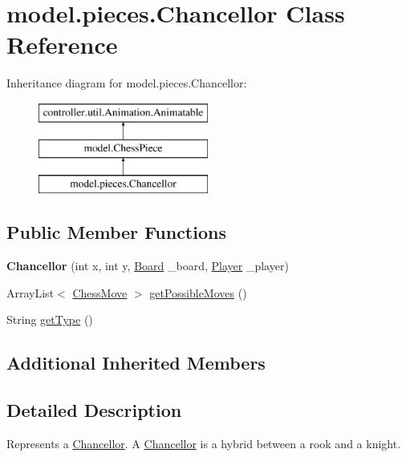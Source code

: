 \hypertarget{classmodel_1_1pieces_1_1_chancellor}{\section{model.\-pieces.\-Chancellor Class Reference}
\label{classmodel_1_1pieces_1_1_chancellor}
}
Inheritance diagram for model.\-pieces.\-Chancellor\-:\begin{figure}[H]
\begin{center}
\leavevmode
\includegraphics[height=3.000000cm]{classmodel_1_1pieces_1_1_chancellor}
\end{center}
\end{figure}
\subsection*{Public Member Functions}
\begin{DoxyCompactItemize}
\item 
\hypertarget{classmodel_1_1pieces_1_1_chancellor_a5f53a98bd7cd419520e17cd9a692fc15}{{\bfseries Chancellor} (int x, int y, \hyperlink{classmodel_1_1board_1_1_board}{Board} \-\_\-board, \hyperlink{classcontroller_1_1_player}{Player} \-\_\-player)}\label{classmodel_1_1pieces_1_1_chancellor_a5f53a98bd7cd419520e17cd9a692fc15}

\item 
Array\-List$<$ \hyperlink{classmodel_1_1_chess_move}{Chess\-Move} $>$ \hyperlink{classmodel_1_1pieces_1_1_chancellor_a6ec06408734037a969ac9d6d0090894a}{get\-Possible\-Moves} ()
\item 
String \hyperlink{classmodel_1_1pieces_1_1_chancellor_ad8eb0d56c97defeb526ade8f63ee9e90}{get\-Type} ()
\end{DoxyCompactItemize}
\subsection*{Additional Inherited Members}


\subsection{Detailed Description}
Represents a \hyperlink{classmodel_1_1pieces_1_1_chancellor}{Chancellor}. A \hyperlink{classmodel_1_1pieces_1_1_chancellor}{Chancellor} is a hybrid between a rook and a knight.

